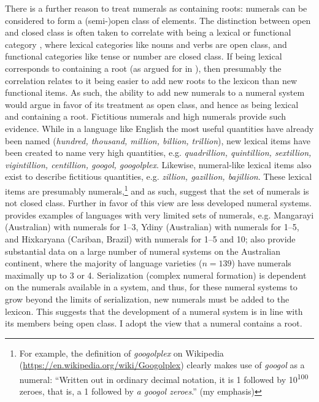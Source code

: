 \documentclass[output=paper]{langscibook}
\begin{document}
There is a further reason to treat numerals as containing roots: numerals can be considered to form a (semi-)open class of elements. The distinction between open and closed class is often taken to correlate with being a lexical or functional category \citep[e.g.][]{abney1987english}, where lexical categories like nouns and verbs are open class, and functional categories like tense or number are closed class. If being lexical corresponds to containing a root (as argued for in \citealt[Ch. 2]{klockmann2017semiLex}), then presumably the correlation relates to it being easier to add new roots to the lexicon than new functional items. As such, the ability to add new numerals to a numeral system would argue in favor of its treatment as open class, and hence as being lexical and containing a root. Fictitious numerals and high numerals provide such evidence. While in a language like English the most useful quantities have already been named (\textit{hundred, thousand, million, billion, trillion}), new lexical items have been created to name very high quantities, e.g. \textit{quadrillion, quintillion, sextillion, vigintillion, centillion, googol, googolplex}. Likewise, numeral-like lexical items also exist to describe fictitious quantities, e.g. \textit{zillion, gazillion, bajillion}. These lexical items are presumably numerals,{\footnote{For example, the definition of \textit{googolplex} on Wikipedia (\url{https://en.wikipedia.org/wiki/Googolplex}) clearly makes use of \textit{googol} as a numeral: ``Written out in ordinary decimal notation, it is 1 followed by 10\textsuperscript{100} zeroes, that is, a 1 followed by \textit{a googol zeroes}.'' (my emphasis)}} and as such, suggest that the set of numerals is not closed class. Further in favor of this view are less developed numeral systems. \citet{comrie2013num} provides examples of languages with very limited sets of numerals, e.g. Mangarayi (Australian) with numerals for 1--3, Ydiny (Australian) with numerals for 1--5, and Hixkaryana (Cariban, Brazil) with numerals for 1--5 and 10; \citet{bowern2012AusNum} also provide substantial data on a large number of numeral systems on the Australian continent, where the majority of language varieties ($n=139$) have numerals maximally up to 3 or 4. Serialization (complex numeral formation) is dependent on the numerals available in a system, and thus, for these numeral systems to grow beyond the limits of serialization, new numerals must be added to the lexicon. This suggests that the development of a numeral system is in line with its members being open class. I adopt the view that a numeral contains a root.
\end{document}
